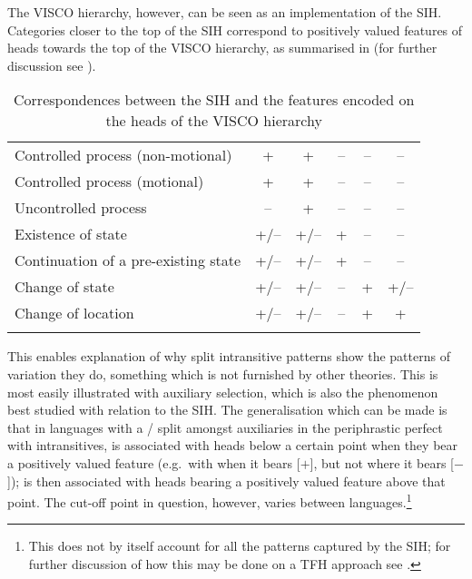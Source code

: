 \documentclass[output=paper]{langsci/langscibook}
\begin{document}
The VISCO hierarchy, however, can be seen as an implementation of the SIH\@.
Categories closer to the top of the \gls{SIH} correspond to positively valued
features of heads towards the top of the VISCO hierarchy, as summarised in
 (for further discussion see \citealt{Baker2019}).

\begin{table}
\begin{tabularx}{\textwidth}{Qccccc}
\lsptoprule
&  &  &  &  & \\\midrule
Controlled process (non-motional) & + & + & – & – & –\\
Controlled process (motional) & + & + & – & – & –\\
Uncontrolled process & – & + & – & – & –\\
Existence of state & +/– & +/– & + & – & –\\
Continuation of a pre-existing state & +/– & +/– & + & – & –\\
Change of state & +/– & +/– & – & + & +/–\\
Change of location & +/– & +/– & – & + & +\\
\lspbottomrule
\end{tabularx}
\caption{Correspondences between the \gls{SIH} and the features encoded on the heads
    of the VISCO hierarchy}\label{tab:key:19.3}
\end{table}

This enables explanation of why split intransitive patterns show the patterns
of variation they do, something which is not furnished by other theories. This
is most easily illustrated with auxiliary selection, which is
also the phenomenon best studied with relation to the SIH\@. The generalisation
which can be made is that in languages with a \HAVE\slash\BE{} split amongst auxiliaries
in the periphrastic perfect with intransitives, \BE{} is associated with heads
below a certain point when they bear a positively valued feature (e.g.\ with
\Oriented{} when it bears [$+$\Oriented{}], but not where it bears [$-$\Oriented{}]);
\HAVE{} is then associated with heads bearing a positively valued feature above
that point. The cut-off point in question, however, varies between
languages.\footnote{This does not by itself account for all the patterns
captured by the \gls{SIH}; for further discussion of how this may be done on a
TFH approach see \citet{Baker2018}.}
\end{document}
